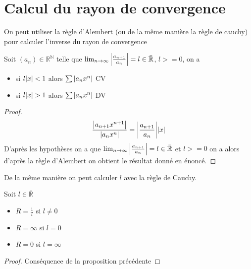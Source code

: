 \documentclass[11pt,colorlinks]{book}
\theoremstyle{mytheoremstyle}
\theoremstyle{mytheoremstyle}
\theoremstyle{mytheoremstyle}
\theoremstyle{mytheoremstyle}
\theoremstyle{mytheoremstyle}
\theoremstyle{mytheoremstyle}
\theoremstyle{mytheoremstyle}
\theoremstyle{mytheoremstyle}
\theoremstyle{myproblemstyle}
\def\mbb#1{\mathbb{#1}}
\def\bN{\mbb{N}}
\def\bR{\mbb{R}}
\def\ln{\lim_{n \to \infty}}
\def\rN{\bR^{\bN}}
\begin{document}
\section{Calcul du rayon de convergence}
On peut utiliser la règle d'Alembert (ou de la même manière la règle de cauchy) pour calculer l'inverse du rayon de convergence
\begin{prop}

  Soit $(a_n) \in \rN$ telle que $\ln \abs{\frac{a_{n+1}}{a_n}} = l \in \bar{\bR}$, $l >= 0$, on a 
  \begin{itemize}
    \item si $l\abs{x} < 1$ alors $\sum \abs{a_nx^n}$ CV 
    \item si $l\abs{x} > 1$ alors $\sum \abs{a_nx^n}$ DV
  \end{itemize}
  \begin{proof}
    
  \begin{equation}
    \frac{\abs{a_{n+1}x^{n+1}}}{\abs{a_nx^n}} = \abs{\frac{a_{n+1}}{a_n}}\abs{x}
  \end{equation}
  D'après les hypothèses on a que $\ln \abs{\frac{a_{n+1}}{a_n}} = l \in \bar{\bR}$ et $l >= 0$
  on a alors d'après la règle d'Alembert on obtient le résultat donné en énoncé.
\end{proof}
\end{prop}
\begin{rmq}
  De la même manière on peut calculer $l$ avec la règle de Cauchy.
\end{rmq}
\begin{prop}
  Soit $l \in \bar{\bR}$
  \begin{itemize}
    \item $R = \frac{1}{l}$ si $l \not= 0$
    \item $R = \infty$ si $l=0$ 
    \item $R = 0$ si $l = \infty$
  \end{itemize}
  \begin{proof}
    Conséquence de la proposition précédente
  \end{proof}
\end{prop}
\end{document}
